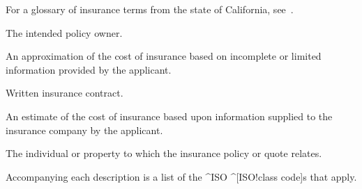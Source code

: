 %
%

For a glossary of insurance terms from the state of California,
see~\cite{gls-ins-calif}.

\begin{description}
  The intended policy owner.

  An approximation of the cost of insurance based on incomplete or limited
  information provided by the applicant.

  Written insurance contract.

  An estimate of the cost of insurance based upon information supplied to the
  insurance company by the applicant.

  The individual or property to which the insurance policy or quote relates.
\end{description}


Accompanying each description is a list of the ^ISO ^[ISO!class code]s that
apply.

